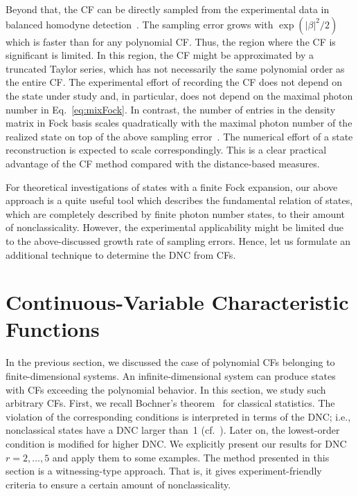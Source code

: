 \documentclass[aps,pra,twocolumn,showpacs,superscriptaddress,10pt]{revtex4-1}
\begin{document}
	Beyond that, the CF can be directly sampled from the experimental data in balanced homodyne detection~\cite{Lvovsky2002,Kiesel2009,Ryl2015}.
	The sampling error grows with $\exp(|\beta|^2/2)$~\cite{Kiesel2009} which is faster than for any polynomial CF.
	Thus, the region where the CF is significant is limited.
	In this region, the CF might be approximated by a truncated Taylor series, which has not necessarily the same polynomial order as the entire CF.
	The experimental effort of recording the CF does not depend on the state under study and, in particular, does not depend on the maximal photon number in Eq.~\eqref{eq:mixFock}.
	In contrast, the number of entries in the density matrix in Fock basis scales quadratically with the maximal photon number of the realized state on top of the above sampling error~\cite{Leonhardt1995}.
	The numerical effort of a state reconstruction is expected to scale correspondingly.
	This is a clear practical advantage of the CF method compared with the distance-based measures.
	
	For theoretical investigations of states with a finite Fock expansion, our above approach is a quite useful tool which describes the fundamental relation of states, which are completely described by finite photon number states, to their amount of nonclassicality.
	However, the experimental applicability might be limited due to the above-discussed growth rate of sampling errors.
	Hence, let us formulate an additional technique to determine the DNC from CFs.

\section{Continuous-Variable Characteristic Functions}\label{sec:Boch}
	In the previous section, we discussed the case of polynomial CFs belonging to finite-dimensional systems.
	An infinite-dimensional system can produce states with CFs exceeding the polynomial behavior.
	In this section, we study such arbitrary CFs.
	First, we recall Bochner's theorem~\cite{Bochner1933} for classical statistics.
	The violation of the corresponding conditions is interpreted in terms of the DNC; i.e., nonclassical states have a DNC larger than~1 (cf.~\cite{Vogel2000}).
	Later on, the lowest-order condition is modified for higher DNC.
	We explicitly present our results for DNC $r=2,\dots,5$ and apply them to some examples.
	The method presented in this section is a witnessing-type approach.
	That is, it gives experiment-friendly criteria to ensure a certain amount of nonclassicality.
\end{document}
